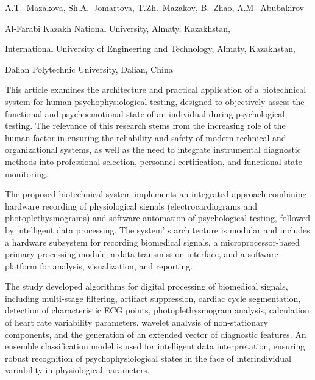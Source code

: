 
\begin{header}

A.T.~Mazakova,
Sh.A.~Jomartova,
T.Zh.~Mazakov\envelope,
B.~Zhao,
A.M.~Abubakirov
\end{header}

\begin{affil}
Al-Farabi Kazakh National University, Almaty, Kazakhstan,

International University of Engineering and Technology, Almaty, Kazakhstan,

 Dalian Polytechnic University, Dalian, China

\end{affil}

This article examines the architecture and practical application of a
biotechnical system for human psychophysiological testing, designed to
objectively assess the functional and psychoemotional state of an
individual during psychological testing. The relevance of this research
stems from the increasing role of the human factor in ensuring the
reliability and safety of modern technical and organizational systems,
as well as the need to integrate instrumental diagnostic methods into
professional selection, personnel certification, and functional state
monitoring.

The proposed biotechnical system implements an integrated approach
combining hardware recording of physiological signals
(electrocardiograms and photoplethysmograms) and software automation of
psycho\-logical testing, followed by intelligent data processing. The
system' s architecture is modular and includes a hardware
subsystem for recording biomedical signals, a microprocessor-based
primary processing mo\-dule, a data transmission interface, and a software
platform for analysis, visualization, and reporting.

The study developed algorithms for digital processing of biomedical
signals, including multi-stage filtering, artifact suppression, cardiac
cycle segmentation, detection of characteristic ECG points,
photop\-lethysmogram analysis, calculation of heart rate variability
parameters, wavelet analysis of non-stationary components, and the
generation of an extended vector of diagnostic features. An ensemble
classification model is used for intelligent data interpretation,
ensuring robust recognition of psychophysiological states in the face of
interindividual variability in physiological parameters.

